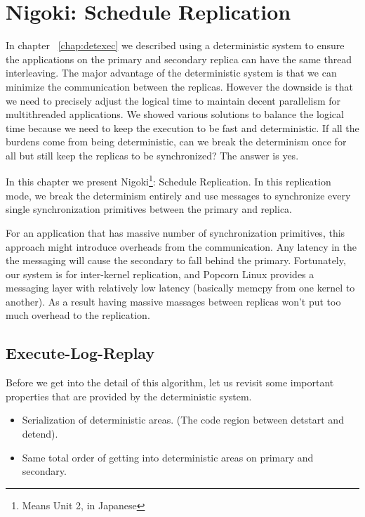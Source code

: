 \chapter{Nigoki: Schedule Replication} \label{chap:schedrep}
In chapter ~\ref{chap:detexec} we described using a deterministic system to ensure the applications on the primary and secondary replica can have the same thread interleaving. The major advantage of the deterministic system is that we can minimize the communication between the replicas. However the downside is that we need to precisely adjust the logical time to maintain decent parallelism for multithreaded applications. We showed various solutions to balance the logical time because we need to keep the execution to be fast and deterministic. If all the burdens come from being deterministic, can we break the determinism once for all but still keep the replicas to be synchronized? The answer is yes.

In this chapter we present Nigoki\footnote{Means Unit 2, in Japanese}: Schedule Replication. In this replication mode, we break the determinism entirely and use messages to synchronize every single synchronization primitives between the primary and replica.

For an application that has massive number of synchronization primitives, this approach might introduce overheads from the communication. Any latency in the the messaging will cause the secondary to fall behind the primary. Fortunately, our system is for inter-kernel replication, and Popcorn Linux provides a messaging layer with relatively low latency (basically memcpy from one kernel to another). As a result having massive massages between replicas won't put too much overhead to the replication.


\section{Execute-Log-Replay}
Before we get into the detail of this algorithm, let us revisit some important properties that are provided by the deterministic system.

\begin{itemize}
\item Serialization of deterministic areas. (The code region between detstart and detend).
\item Same total order of getting into deterministic areas on primary and secondary.
\end{itemize}

